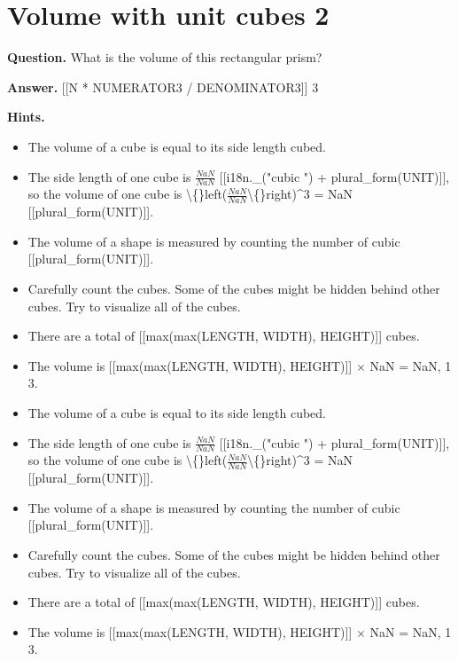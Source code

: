 \documentclass{article}
\begin{document}
\section*{Volume with unit cubes 2}
\textbf{Question.} What is the volume of this rectangular prism?

\textbf{Answer.} [[N * NUMERATOR3 / DENOMINATOR3]] 3

\textbf{Hints.}
\begin{itemize}
  \item The volume of a cube is equal to its side length cubed.
  \item The side length of one cube is $\frac{NaN}{NaN}$ [[i18n.\_("cubic ") + plural\_form(UNIT)]],
                    so the volume of one cube is \textbackslash\{\}left($\frac{NaN}{NaN}$\textbackslash\{\}right)\textasciicircum{}3 = 
                    NaN [[plural\_form(UNIT)]].
  \item The volume of a shape is measured by counting the number of cubic [[plural\_form(UNIT)]].
  \item Carefully count the cubes. Some of the cubes might be hidden behind other cubes. Try to visualize all of the cubes.
  \item There are a total of [[max(max(LENGTH, WIDTH), HEIGHT)]] cubes.
  \item The volume is [[max(max(LENGTH, WIDTH), HEIGHT)]] $\times$ NaN = 
                    NaN, 1 3.
  \item The volume of a cube is equal to its side length cubed.
  \item The side length of one cube is $\frac{NaN}{NaN}$ [[i18n.\_("cubic ") + plural\_form(UNIT)]],
                    so the volume of one cube is \textbackslash\{\}left($\frac{NaN}{NaN}$\textbackslash\{\}right)\textasciicircum{}3 = 
                    NaN [[plural\_form(UNIT)]].
  \item The volume of a shape is measured by counting the number of cubic [[plural\_form(UNIT)]].
  \item Carefully count the cubes. Some of the cubes might be hidden behind other cubes. Try to visualize all of the cubes.
  \item There are a total of [[max(max(LENGTH, WIDTH), HEIGHT)]] cubes.
  \item The volume is [[max(max(LENGTH, WIDTH), HEIGHT)]] $\times$ NaN = 
                    NaN, 1 3.
\end{itemize}
\end{document}
